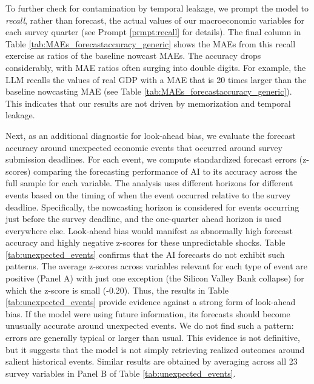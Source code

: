 \documentclass[11pt,letterpaper]{scrartcl}
\begin{document}
To further check for contamination by temporal leakage, we prompt the model to \emph{recall}, rather than forecast, the actual values of our macroeconomic variables for each survey quarter (see Prompt \ref{prmpt:recall} for details). The final column in Table \ref{tab:MAEs_forecastaccuracy_generic} shows the MAEs from this recall exercise as ratios of the baseline nowcast MAEs. The accuracy drops considerably, with MAE ratios often surging into double digits. %
For example, the LLM recalls the values of real GDP with a MAE that is 20 times larger than the baseline nowcasting MAE (see Table \ref{tab:MAEs_forecastaccuracy_generic}). This indicates that our results are not driven by memorization and temporal leakage. 

Next, as an additional diagnostic for look-ahead bias, we evaluate the forecast accuracy around unexpected economic events that occurred around survey submission deadlines. For each event, we compute standardized forecast errors (z-scores) comparing the forecasting performance of AI to its accuracy across the full sample for each variable. The analysis uses different horizons for different events based on the timing of when the event occurred relative to the survey deadline. Specifically, the nowcasting horizon is considered for events occurring just before the survey deadline, and the one-quarter ahead horizon is used everywhere else. Look-ahead bias would manifest as abnormally high forecast accuracy and highly negative z-scores for these unpredictable shocks. Table \ref{tab:unexpected_events} confirms that the AI forecasts do not exhibit such patterns. The average z-scores across variables relevant for each type of event are positive (Panel A) with just one exception (the Silicon Valley Bank collapse) for which the z-score is small (-0.20). Thus, the results in Table \ref{tab:unexpected_events}  provide evidence against a strong form of look-ahead bias. If the model were using future information, its forecasts should become unusually accurate around unexpected events. We do not find such a pattern: errors are generally typical or larger than usual. This evidence is not definitive, but it suggests that the model is not simply retrieving realized outcomes around salient historical events. Similar results are obtained by averaging across all 23 survey variables in Panel B of Table \ref{tab:unexpected_events}.
\end{document}
